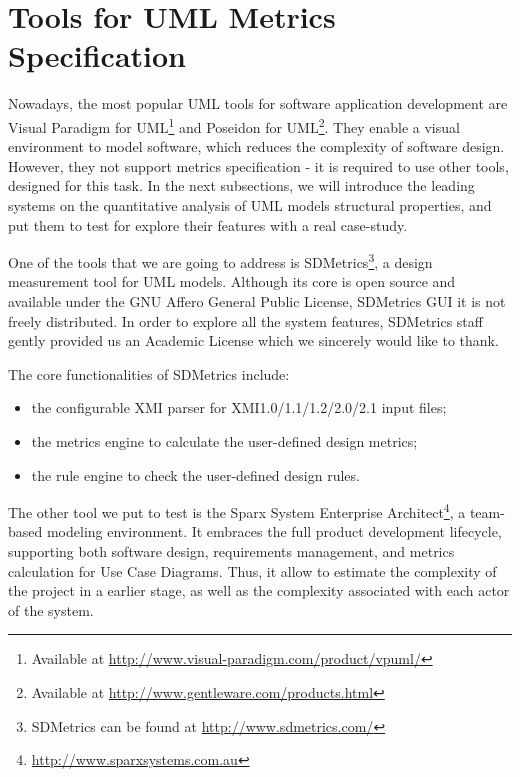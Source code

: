 \section{Tools for UML Metrics Specification}\label{tools}

Nowadays, the most popular UML tools for software application development are \textsf{Visual Paradigm for UML\footnote{Available at \url{http://www.visual-paradigm.com/product/vpuml/}}} and \textsf{Poseidon for UML}\footnote{Available at \url{http://www.gentleware.com/products.html}}.
They enable a visual environment to model software, which reduces the complexity of software design.
However, they not support metrics specification - it is required to use other tools, designed for this task.
In the next subsections, we will introduce the leading systems on the quantitative analysis of UML models structural properties, and put them to test for explore their features with a real case-study.

One of the tools that we are going to address is SDMetrics\footnote{SDMetrics can be found at \url{http://www.sdmetrics.com/}}, a design measurement tool for UML models.
Although its core is open source and available under the GNU Affero General Public License, SDMetrics GUI it is not freely distributed. 
In order to explore all the system features, SDMetrics staff gently provided us an Academic License which we sincerely would like to thank.

The core functionalities of SDMetrics include:
\begin{itemize}
\item the configurable XMI parser for XMI1.0/1.1/1.2/2.0/2.1 input files;
\item the metrics engine to calculate the user-defined design metrics;
\item the rule engine to check the user-defined design rules.
\end{itemize}


The other tool we put to test is the \textsf{Sparx System Enterprise Architect}{\footnote{\url{http://www.sparxsystems.com.au}}}, a team-based modeling environment. 
It embraces the full product development lifecycle, supporting both software design, requirements management, and metrics calculation for Use Case Diagrams.
Thus, it allow to estimate the complexity of the project in a earlier stage, as well as the complexity associated with each actor of the system.

